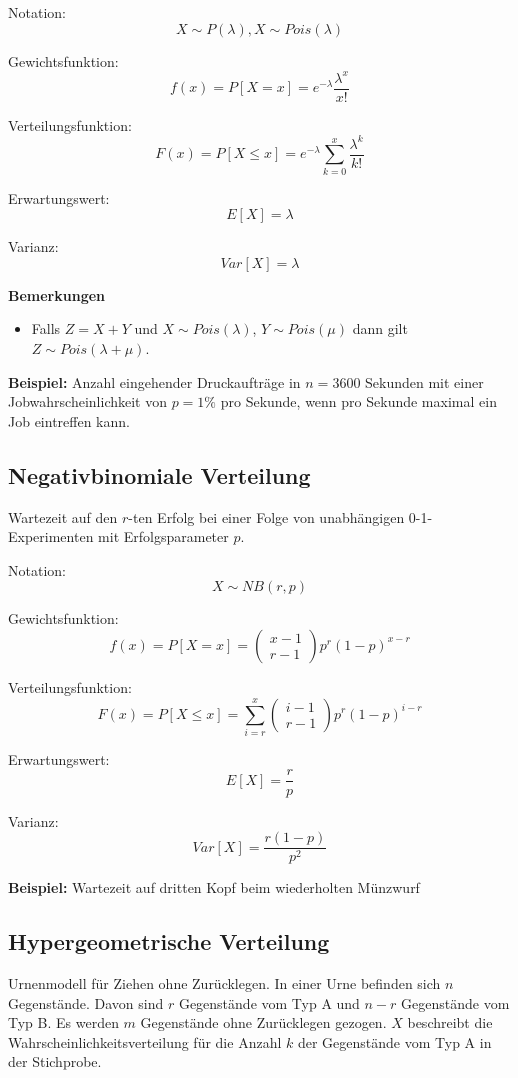\documentclass[10pt,a4paper,twocolumn]{article}
\begin{document}
\vspace{10pt}

Notation:
\[
X \sim P(\lambda), X \sim Pois(\lambda)
\]

Gewichtsfunktion:
\[
f(x)=P[X=x]=e^{-\lambda}\frac{\lambda^{x}}{x!}
\]

Verteilungsfunktion:
\[
F(x)=P[X \leq x]=e^{-\lambda}\sum \limits_{k=0}^x \frac{\lambda^{k}}{k!}
\]

Erwartungswert:
\[
E[X]=\lambda
\]

Varianz:
\[
Var[X]=\lambda
\]

\textbf{Bemerkungen}
\begin{itemize}
\item Falls $Z=X+Y$ und $X\sim Pois(\lambda)$, $Y\sim Pois(\mu)$ dann gilt $Z\sim Pois(\lambda+\mu)$.
\end{itemize}

\textbf{Beispiel:} Anzahl eingehender Druckaufträge in $n=3600$ Sekunden mit einer Jobwahrscheinlichkeit von $p=1\%$ pro Sekunde, wenn pro Sekunde maximal ein Job eintreffen kann.

\subsection{Negativbinomiale Verteilung}
Wartezeit auf den $r$-ten Erfolg bei einer Folge von unabhängigen 0-1-Experimenten mit Erfolgsparameter $p$.

Notation:
\[
X \sim NB(r,p)
\]

Gewichtsfunktion:
\[
f(x)=P[X=x]=\left(
	\begin{array}{c}
		x-1 \\
		r-1
	\end{array}
\right)p^{r}(1-p)^{x-r}
\]

Verteilungsfunktion:
\[
F(x)=P[X \leq x]=\sum \limits_{i=r}^x
\left(
	\begin{array}{c}
		i-1 \\
		r-1
	\end{array}
\right)p^{r}(1-p)^{i-r}
\]

Erwartungswert:
\[
E[X]=\frac{r}{p}
\]

Varianz:
\[
Var[X]=\frac{r(1-p)}{p^2}
\]

\textbf{Beispiel:} Wartezeit auf dritten Kopf beim wiederholten Münzwurf

\subsection{Hypergeometrische Verteilung}
Urnenmodell für Ziehen ohne Zurücklegen. In einer Urne befinden sich $n$ Gegenstände. Davon sind $r$ Gegenstände vom Typ A und $n-r$ Gegenstände vom Typ B. Es werden $m$ Gegenstände ohne Zurücklegen gezogen. $X$ beschreibt die Wahrscheinlichkeitsverteilung für die Anzahl $k$ der Gegenstände vom Typ A in der Stichprobe.
\end{document}
